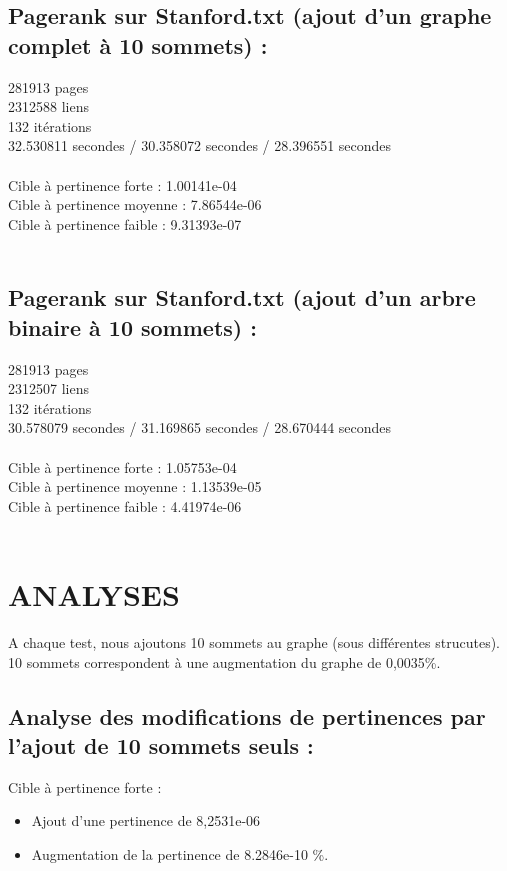 \documentclass[a4paper,11pt]{article}
\begin{document}
	\subsection{Pagerank sur Stanford.txt (ajout d'un graphe complet à 10 sommets) :}
		281913 pages\\
		2312588 liens\\
		132 itérations\\
		32.530811 secondes / 30.358072 secondes / 28.396551 secondes\\
		\\
		Cible à pertinence forte : 1.00141e-04\\	
		Cible à pertinence moyenne : 7.86544e-06\\
		Cible à pertinence faible : 9.31393e-07\\
		\\
	\subsection{Pagerank sur Stanford.txt (ajout d'un arbre binaire à 10 sommets) :}
		281913 pages\\
		2312507 liens\\
		132 itérations\\
		30.578079 secondes / 31.169865 secondes / 28.670444 secondes\\
		\\
		Cible à pertinence forte : 1.05753e-04\\
		Cible à pertinence moyenne : 1.13539e-05\\
		Cible à pertinence faible : 4.41974e-06\\
		\\
\section{ANALYSES}
	A chaque test, nous ajoutons 10 sommets au graphe (sous différentes strucutes). 10 sommets correspondent à une augmentation du graphe de 0,0035\%.\\

	\subsection{Analyse des modifications de pertinences par l'ajout de 10 sommets seuls :}
		Cible à pertinence forte :
		\begin{itemize} 	
			\item Ajout d'une pertinence de 8,2531e-06
			\item Augmentation de la pertinence de 8.2846e-10 \%.
		\end{itemize}
		
\end{document}
